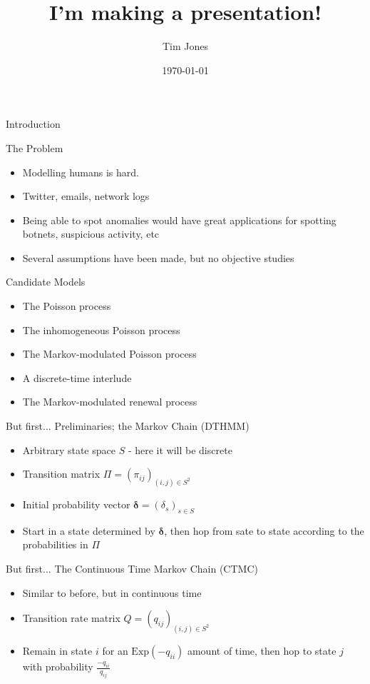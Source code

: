 \documentclass{beamer}
\title[Talking about things]{I'm making a presentation!}
\author{Tim Jones}
\institute{Some room in the maths building I guess.}
\date{\today}
\begin{document}
\begin{frame}{Introduction}
\titlepage
\end{frame}

\begin{frame}{The Problem}
\begin{itemize}
\item Modelling humans is hard.
\pause \item Twitter, emails, network logs
\pause \item Being able to spot anomalies would have great applications for spotting botnets, suspicious activity, etc
\pause \item Several assumptions have been made, but no objective studies
\end{itemize}
\end{frame}

\begin{frame}{Candidate Models}
\begin{itemize}
\item The Poisson process
\pause \item The inhomogeneous Poisson process
\pause \item The Markov-modulated Poisson process
\pause \item A discrete-time interlude
\pause \item The Markov-modulated renewal process
\end{itemize}
\end{frame}

\begin{frame}{But first...}
Preliminaries; the Markov Chain (DTHMM)
\begin{itemize}
\pause \item Arbitrary state space $S$ - here it will be discrete
\pause \item Transition matrix $\Pi = (\pi_{ij})_{(i,j) \in S^2}$
\pause \item Initial probability vector $\bm{\delta} = (\delta_s)_{s \in S}$
\pause \item Start in a state determined by $\bm{\delta}$, then hop from sate to state according to the probabilities in $\Pi$
\end{itemize}
\end{frame}

\begin{frame}{But first...}
The Continuous Time Markov Chain (CTMC)
\begin{itemize}
\pause \item Similar to before, but in continuous time
\pause \item Transition rate matrix $Q = (q_{ij})_{(i,j) \in S^2}$
\pause \item Remain in state $i$ for an $\mathrm{Exp}(-q_{ii})$ amount of time, then hop to state $j$ with probability $\frac{-q_{ii}}{q_{ij}}$
\end{itemize}
\end{frame}
\end{document}
